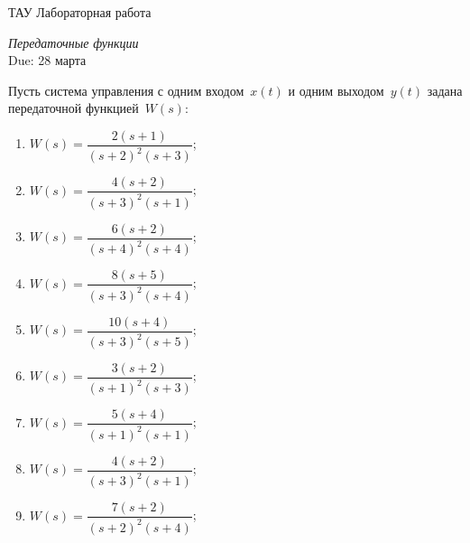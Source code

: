 \documentclass[a4paper,oneside,10pt]{book}
\theoremstyle{definition}
\begin{document}
\begin{center}
	{\large  ТАУ \hspace{0.1cm} Лабораторная работа }

	\vspace{5pt}
	\textit{\large Передаточные функции}\\ %
	\vspace{10pt}
	Due: 28 марта %
\end{center}

\vspace{0.2 cm}



Пусть система управления с одним входом~$ x(t) $ и одним выходом~$ y(t) $ задана  передаточной функцией~$ W(s) $:

\begin{multicols}{2}
	\begin{enumerate}
		\item

		      $ 	W(s) =
			      \dfrac{2(s+1)}
			      {(s+2)^2(s+3)} $;
		\item

		      $ 	W(s) =
			      \dfrac{4(s+2)}
			      {(s+3)^2(s+1)} $;

		\item

		      $ 		W(s) =
			      \dfrac{6(s+2)}
			      {(s+4)^2(s+4)} $;

		\item

		      $ 	W(s) =
			      \dfrac{8(s+5)}
			      {(s+3)^2(s+4)} $;

		\item

		      $ 	W(s) =
			      \dfrac{10(s+4)}
			      {(s+3)^2(s+5)} $;

		\item

		      $ 	W(s) =
			      \dfrac{3(s+2)}
			      {(s+1)^2(s+3)} $;

		\item

		      $ W(s) =
			      \dfrac{5(s+4)}
			      {(s+1)^2(s+1)} $;
		\item

		      $ W(s) =
			      \dfrac{4(s+2)}
			      {(s+3)^2(s+1)} $;

		\item

		      $ W(s) =
			      \dfrac{7(s+2)}
			      {(s+2)^2(s+4)} $;


\end{enumerate}
\end{multicols}
\end{document}
